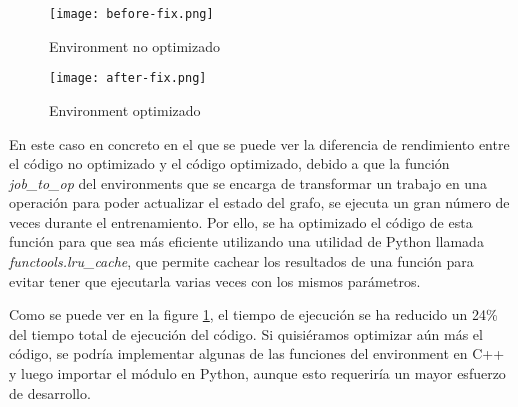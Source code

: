 \begin{figure}
    \centering
    \begin{minipage}{0.47\textwidth}
        \centering
        \texttt{[image: before-fix.png]} 
        \caption{Environment no optimizado}
    \end{minipage}\hfill
    \begin{minipage}{0.47\textwidth}
        \centering
        \texttt{[image: after-fix.png]}
        \caption{Environment optimizado}
        \label{fig:after-fix}
    \end{minipage}
\end{figure}

En este caso en concreto en el que se puede ver la diferencia de rendimiento
entre el código no optimizado y el código optimizado, debido a que la función
\textit{job\_to\_op} del environments que se encarga de transformar un trabajo
en una operación para poder actualizar el estado del grafo, se ejecuta un gran
número de veces durante el entrenamiento. Por ello, se ha optimizado el código
de esta función para que sea más eficiente utilizando una utilidad de Python
llamada \textit{functools.lru\_cache}, que permite cachear los resultados de
una función para evitar tener que ejecutarla varias veces con los mismos
parámetros.\medskip

Como se puede ver en la figure \ref{fig:after-fix}, el tiempo de ejecución
se ha reducido un 24\% del tiempo total de ejecución del código. Si quisiéramos
optimizar aún más el código, se podría implementar algunas de las funciones
del environment en C++ y luego importar el módulo en Python, aunque esto
requeriría un mayor esfuerzo de desarrollo. 